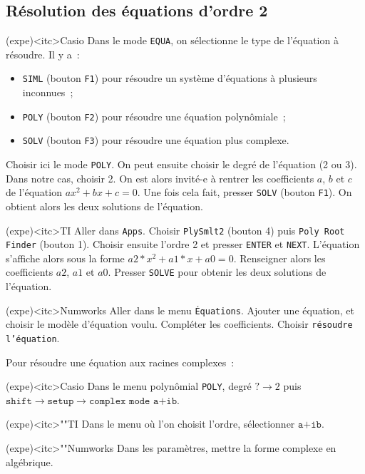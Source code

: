 \documentclass[a4paper, 12pt, garamond]{book}
\begin{document}
\subsection{R\'esolution des équations d'ordre 2}

\begin{tcn}(expe)<itc>{Casio}
	Dans le mode \texttt{EQUA}, on sélectionne le type de l'équation à résoudre.
	Il y a~:
	\begin{itemize}
		\item \texttt{SIML} (bouton \texttt{F1}) pour résoudre un système
		      d'équations à plusieurs inconnues~;
		\item \texttt{POLY} (bouton \texttt{F2}) pour résoudre une équation
		      polynômiale~;
		\item \texttt{SOLV} (bouton \texttt{F3}) pour résoudre une équation plus
		      complexe.
	\end{itemize}
	Choisir ici le mode \texttt{POLY}. On peut ensuite choisir le degré de
	l'équation (2 ou 3). Dans notre cas, choisir 2. On est alors invité-e à
	rentrer les coefficients $a$, $b$ et $c$ de l'équation $ax^2+bx+c=0$. Une fois
	cela fait, presser \texttt{SOLV} (bouton \texttt{F1}). On obtient alors les
	deux solutions de l'équation.
\end{tcn}

\begin{tcn}(expe)<itc>{TI}
	Aller dans \texttt{Apps}. Choisir \texttt{PlySmlt2} (bouton 4) puis
	\texttt{Poly Root Finder} (bouton 1). Choisir ensuite l'ordre 2 et presser
	\texttt{ENTER} et \texttt{NEXT}. L'équation s'affiche alors sous la forme
	$a2*x^2+a1*x+a0=0$. Renseigner alors les coefficients $a2$, $a1$ et $a0$.
	Presser \texttt{SOLVE} pour obtenir les deux solutions de l'équation.
\end{tcn}

\begin{tcn}(expe)<itc>{Numworks}
	Aller dans le menu \texttt{Équations}. Ajouter une équation, et choisir le
	modèle d'équation voulu. Compléter les coefficients. Choisir \texttt{résoudre
		l'équation}.
\end{tcn}

Pour résoudre une équation aux racines complexes~:

\begin{tcbraster}[raster columns=3, raster equal height=rows]
	\begin{tcn}(expe)<itc>{Casio}
		Dans le menu polynômial \texttt{POLY}, degré $? \rightarrow
			2$ puis $\texttt{shift} \rightarrow \texttt{setup} \rightarrow
			\texttt{complex mode a+ib}$.
	\end{tcn}
	\begin{tcn}(expe)<itc>""{TI}
		Dans le menu où l'on choisit l'ordre, sélectionner $\texttt{a+ib}$.
	\end{tcn}
	\begin{tcn}(expe)<itc>""{Numworks}
		Dans les paramètres, mettre la forme complexe en algébrique.
	\end{tcn}
\end{tcbraster}
\end{document}
